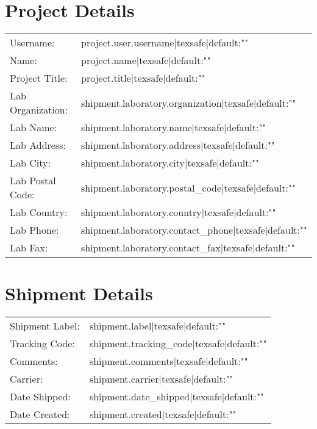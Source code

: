 \documentclass[6pt]{article}
\begin{document}
	\section*{Project Details}
	
	\begin{tabular}{ll}
		Username: & {{ project.user.username|texsafe|default:"" }} \\
		Name: & {{ project.name|texsafe|default:"" }} \\
		Project Title: & {{ project.title|texsafe|default:"" }} \\
		Lab Organization: & {{ shipment.laboratory.organization|texsafe|default:"" }} \\
		Lab Name: & {{ shipment.laboratory.name|texsafe|default:"" }} \\
		Lab Address: & {{ shipment.laboratory.address|texsafe|default:"" }} \\
		Lab City: & {{ shipment.laboratory.city|texsafe|default:"" }} \\
		Lab Postal Code: & {{ shipment.laboratory.postal_code|texsafe|default:"" }} \\
		Lab Country: & {{ shipment.laboratory.country|texsafe|default:"" }} \\
		Lab Phone: & {{ shipment.laboratory.contact_phone|texsafe|default:"" }} \\
		Lab Fax: & {{ shipment.laboratory.contact_fax|texsafe|default:"" }} \\
	\end{tabular}

	\section*{Shipment Details}

	\begin{tabular}{ll}
		Shipment Label: & {{ shipment.label|texsafe|default:"" }} \\
		Tracking Code: & {{ shipment.tracking_code|texsafe|default:"" }} \\
		Comments: & {{ shipment.comments|texsafe|default:"" }} \\
		Carrier: & {{ shipment.carrier|texsafe|default:"" }} \\
		Date Shipped: & {{ shipment.date_shipped|texsafe|default:"" }} \\
		Date Created: & {{ shipment.created|texsafe|default:"" }} \\
	\end{tabular}
	
\end{document}
